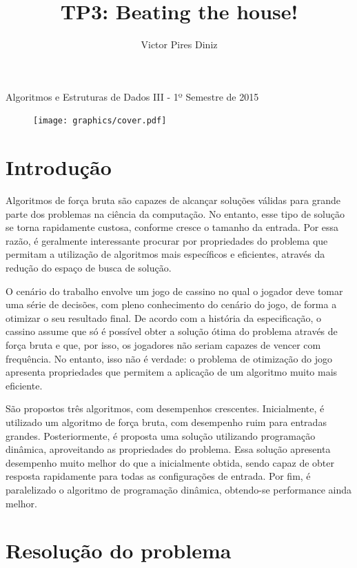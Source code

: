 \documentclass[10pt,a4paper]{article}
\title{TP3: Beating the house!}
\author{Victor Pires Diniz}
\numberwithin{equation}{section}
\begin{document}
\maketitle
\begin{center}
Algoritmos e Estruturas de Dados III - 1º Semestre de 2015
\end{center}

\begin{figure}[H]
    \centering
    \texttt{[image: graphics/cover.pdf]}
    \label{fig:cover}
\end{figure}

\section{Introdução}

Algoritmos de força bruta são capazes de alcançar soluções válidas para grande parte dos problemas na ciência da computação. No entanto, esse tipo de solução se torna rapidamente custosa, conforme cresce o tamanho da entrada. Por essa razão, é geralmente interessante procurar por propriedades do problema que permitam a utilização de algoritmos mais específicos e eficientes, através da redução do espaço de busca de solução.

O cenário do trabalho envolve um jogo de cassino no qual o jogador deve tomar uma série de decisões, com pleno conhecimento do cenário do jogo, de forma a otimizar o seu resultado final. De acordo com a história da especificação, o cassino assume que só é possível obter a solução ótima do problema através de força bruta e que, por isso, os jogadores não seriam capazes de vencer com frequência. No entanto, isso não é verdade: o problema de otimização do jogo apresenta propriedades que permitem a aplicação de um algoritmo muito mais eficiente.

São propostos três algoritmos, com desempenhos crescentes. Inicialmente, é utilizado um algoritmo de força bruta, com desempenho ruim para entradas grandes. Posteriormente, é proposta uma solução utilizando programação dinâmica, aproveitando as propriedades do problema. Essa solução apresenta desempenho muito melhor do que a inicialmente obtida, sendo capaz de obter resposta rapidamente para todas as configurações de entrada. Por fim, é paralelizado o algoritmo de programação dinâmica, obtendo-se performance ainda melhor.

\section{Resolução do problema}
\end{document}
